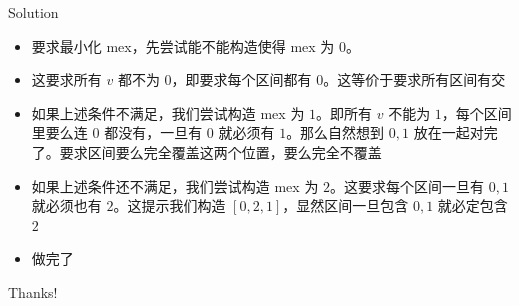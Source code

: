 ﻿\documentclass[aspectratio=169]{ctexbeamer}
\begin{document}
\begin{frame}{Solution}
    \begin{itemize}
        \item 要求最小化 mex，先尝试能不能构造使得 mex 为 $ 0 $。
        \item 这要求所有 $v$ 都不为 $ 0 $，即要求每个区间都有 $ 0 $。这等价于要求所有区间有交
        \item 如果上述条件不满足，我们尝试构造 mex 为 $ 1 $。即所有 $ v $ 不能为 $ 1 $，每个区间里要么连 $ 0 $ 都没有，一旦有 $ 0 $ 就必须有 $ 1 $。那么自然想到 $ 0,1 $ 放在一起对完了。要求区间要么完全覆盖这两个位置，要么完全不覆盖
        \item 如果上述条件还不满足，我们尝试构造 mex 为 $ 2 $。这要求每个区间一旦有 $0,1$ 就必须也有 $2$。这提示我们构造 $[0,2,1]$，显然区间一旦包含 $0,1$ 就必定包含 $2$
        \item 做完了
    \end{itemize}
\end{frame}



\begin{frame}
    \begin{center}
        {\Huge\calligra Thanks!}
    \end{center}
\end{frame}
\end{document}
